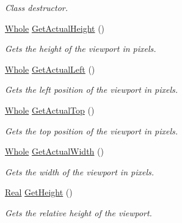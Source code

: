\begin{DoxyCompactItemize}
\begin{DoxyCompactList}\small\item\em Class destructor. \item\end{DoxyCompactList}\item 
\hyperlink{namespaceMezzanine_adcbb6ce6d1eb4379d109e51171e2e493}{Whole} \hyperlink{classMezzanine_1_1Viewport_ab76a92f62936a525509c12672e42203a}{GetActualHeight} ()
\begin{DoxyCompactList}\small\item\em Gets the height of the viewport in pixels. \item\end{DoxyCompactList}\item 
\hyperlink{namespaceMezzanine_adcbb6ce6d1eb4379d109e51171e2e493}{Whole} \hyperlink{classMezzanine_1_1Viewport_a22de6c59dd33f1d26cfc732bbc20eb42}{GetActualLeft} ()
\begin{DoxyCompactList}\small\item\em Gets the left position of the viewport in pixels. \item\end{DoxyCompactList}\item 
\hyperlink{namespaceMezzanine_adcbb6ce6d1eb4379d109e51171e2e493}{Whole} \hyperlink{classMezzanine_1_1Viewport_a844f8438ce4f1046656416246ff68e87}{GetActualTop} ()
\begin{DoxyCompactList}\small\item\em Gets the top position of the viewport in pixels. \item\end{DoxyCompactList}\item 
\hyperlink{namespaceMezzanine_adcbb6ce6d1eb4379d109e51171e2e493}{Whole} \hyperlink{classMezzanine_1_1Viewport_a033b546e1fc35f5835262c270a7d8a94}{GetActualWidth} ()
\begin{DoxyCompactList}\small\item\em Gets the width of the viewport in pixels. \item\end{DoxyCompactList}\item 
\hyperlink{namespaceMezzanine_a726731b1a7df72bf3583e4a97282c6f6}{Real} \hyperlink{classMezzanine_1_1Viewport_a027005681b384d2bc39572ba725cfc65}{GetHeight} ()
\begin{DoxyCompactList}\small\item\em Gets the relative height of the viewport. \item\end{DoxyCompactList}\item 

\end{DoxyCompactItemize}
